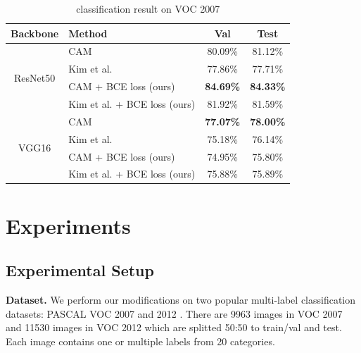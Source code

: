 \documentclass[conference]{IEEEtran}
\begin{document}
\begin{table}[t]
    \centering
    \caption{classification result on VOC 2007}
    \label{tab:classification_map_voc_2007}
    \begin{tabular}{|c|l|c|c|}
        \hline
        Backbone                     & Method                                              & Val                             & Test                            \\
        \hline
        \multirow[c]{4}{*}{ResNet50} & CAM\cite{zhou2015cnnlocalization}                   & 80.09\%                         & 81.12\%                         \\
                                     & Kim et al. \cite{kim2022bridging}                   & 77.86\%                         & 77.71\%                         \\
                                     & CAM\cite{zhou2015cnnlocalization} + BCE loss (ours) & \color{red} \bfseries{84.69\%}  & \color{red} \bfseries{84.33\%}  \\
                                     & Kim et al. \cite{kim2022bridging} + BCE loss (ours) & 81.92\%                         & 81.59\%                         \\
        \hline
        \multirow[c]{4}{*}{VGG16}    & CAM\cite{zhou2015cnnlocalization}                   & \color{blue} \bfseries{77.07\%} & \color{blue} \bfseries{78.00\%} \\
                                     & Kim et al. \cite{kim2022bridging}                   & 75.18\%                         & 76.14\%                         \\
                                     & CAM\cite{zhou2015cnnlocalization} + BCE loss (ours) & 74.95\%                         & 75.80\%                         \\
                                     & Kim et al. \cite{kim2022bridging} + BCE loss (ours) & 75.88\%                         & 75.89\%                         \\
        \hline
    \end{tabular}
\end{table}

\section{Experiments}
\subsection{Experimental Setup}
\textbf{Dataset.} We perform our modifications on two popular multi-label classification datasets: PASCAL VOC 2007 \cite{pascal-voc-2007} and 2012 \cite{pascal-voc-2012}. There are \num{9963} images in VOC 2007 and \num{11530} images in VOC 2012 which are splitted 50:50 to train/val and test.  Each image contains one or multiple labels from 20 categories.
\end{document}
